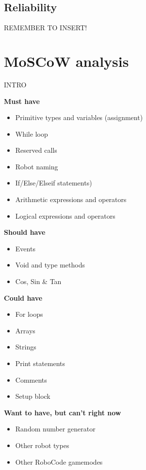\subsection{Reliability}
REMEMBER TO INSERT!

\section{MoSCoW analysis}
\label{sec:MoSCoW}
INTRO

\textbf{Must have}
\begin{itemize}
\item Primitive types and variables (assignment)
\item While loop
\item Reserved calls
\item Robot naming
\item If/Else/Elseif statements)
\item Arithmetic expressions and operators
\item Logical expressions and operators
\end{itemize}
\textbf{Should have}
\begin{itemize}
\item Events
\item Void and type methods
\item Cos, Sin \& Tan
\end{itemize}
\textbf{Could have}
\begin{itemize}
\item For loops
\item Arrays
\item Strings
\item Print statements
\item Comments
\item Setup block
\end{itemize}
\textbf{Want to have, but can’t right now}
\begin{itemize}
\item Random number generator
\item Other robot types
\item Other RoboCode gamemodes
\end{itemize}

 
